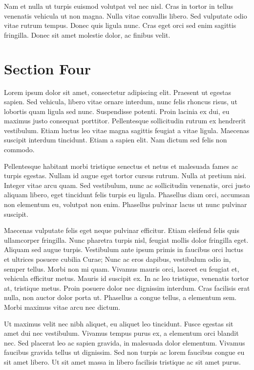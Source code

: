 \documentclass[runningheads,a4paper]{llncs}
\begin{document}
Nam et nulla ut turpis euismod volutpat vel nec nisl. Cras in tortor in tellus venenatis vehicula ut non magna. Nulla vitae convallis libero. Sed vulputate odio vitae rutrum tempus. Donec quis ligula nunc. Cras eget orci sed enim sagittis fringilla. Donec sit amet molestie dolor, ac finibus velit.
%
\newpage
%
\section{Section Four}
%
Lorem ipsum dolor sit amet, consectetur adipiscing elit. Praesent ut egestas sapien. Sed vehicula, libero vitae ornare interdum, nunc felis rhoncus risus, ut lobortis quam ligula sed nunc. Suspendisse potenti. Proin lacinia ex dui, eu maximus justo consequat porttitor. Pellentesque sollicitudin rutrum ex hendrerit vestibulum. Etiam luctus leo vitae magna sagittis feugiat a vitae ligula. Maecenas suscipit interdum tincidunt. Etiam a sapien elit. Nam dictum sed felis non commodo.

Pellentesque habitant morbi tristique senectus et netus et malesuada fames ac turpis egestas. Nullam id augue eget tortor cursus rutrum. Nulla at pretium nisi. Integer vitae arcu quam. Sed vestibulum, nunc ac sollicitudin venenatis, orci justo aliquam libero, eget tincidunt felis turpis eu ligula. Phasellus diam orci, accumsan non elementum eu, volutpat non enim. Phasellus pulvinar lacus ut nunc pulvinar suscipit.

Maecenas vulputate felis eget neque pulvinar efficitur. Etiam eleifend felis quis ullamcorper fringilla. Nunc pharetra turpis nisl, feugiat mollis dolor fringilla eget. Aliquam sed augue turpis. Vestibulum ante ipsum primis in faucibus orci luctus et ultrices posuere cubilia Curae; Nunc ac eros dapibus, vestibulum odio in, semper tellus. Morbi non mi quam. Vivamus mauris orci, laoreet eu feugiat et, vehicula efficitur metus. Mauris id suscipit ex. In ac leo tristique, venenatis tortor at, tristique metus. Proin posuere dolor nec dignissim interdum. Cras facilisis erat nulla, non auctor dolor porta ut. Phasellus a congue tellus, a elementum sem. Morbi maximus vitae arcu nec dictum.

Ut maximus velit nec nibh aliquet, eu aliquet leo tincidunt. Fusce egestas sit amet dui nec vestibulum. Vivamus tempus purus ex, a elementum orci blandit nec. Sed placerat leo ac sapien gravida, in malesuada dolor elementum. Vivamus faucibus gravida tellus ut dignissim. Sed non turpis ac lorem faucibus congue eu sit amet libero. Ut sit amet massa in libero facilisis tristique ac sit amet purus.
\end{document}
